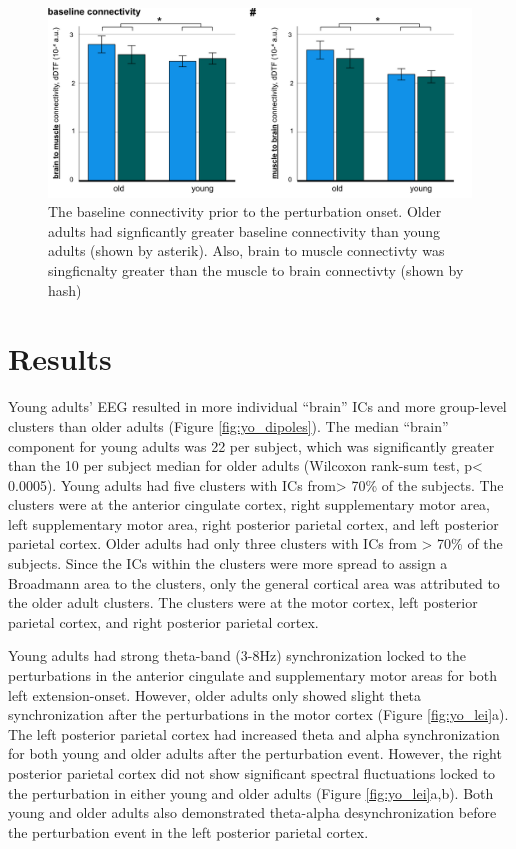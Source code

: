 \documentclass[../thesis_seyed.tex]{subfiles}
\begin{document}
\begin{figure}[tb]
    \centering
    \includegraphics[scale=0.8]{../img/figure 51 - baseline conn.jpg}
    \caption{The baseline connectivity prior to the perturbation onset. Older adults had signficantly greater baseline connectivity than young adults (shown by asterik). Also, brain to muscle connectivty was singficnalty greater than the muscle to brain connectivty (shown by hash)}
    \label{fig:base}
\end{figure}

\section{Results}
Young adults’ EEG resulted in more individual “brain” ICs and more group-level clusters than older adults (Figure \ref{fig:yo_dipoles}). The median “brain” component for young adults was 22 per subject, which was significantly greater than the 10 per subject median for older adults (Wilcoxon rank-sum test, p< 0.0005). Young adults had five clusters with ICs from> 70\% of the subjects. The clusters were at the anterior cingulate cortex, right supplementary motor area, left supplementary motor area, right posterior parietal cortex, and left posterior parietal cortex. Older adults had only three clusters with ICs from > 70\% of the subjects. Since the ICs within the clusters were more spread to assign a Broadmann area to the clusters, only the general cortical area was attributed to the older adult clusters. The clusters were at the motor cortex, left posterior parietal cortex, and right posterior parietal cortex.

Young adults had strong theta-band (3-8Hz) synchronization locked to the perturbations in the anterior cingulate and supplementary motor areas for both left extension-onset. However, older adults only showed slight theta synchronization after the perturbations in the motor cortex (Figure \ref{fig:yo_lei}a). The left posterior parietal cortex had increased theta and alpha synchronization for both young and older adults after the perturbation event. However, the right posterior parietal cortex did not show significant spectral fluctuations locked to the perturbation in either young and older adults (Figure \ref{fig:yo_lei}a,b). Both young and older adults also demonstrated theta-alpha desynchronization before the perturbation event in the left posterior parietal cortex.
\end{document}

